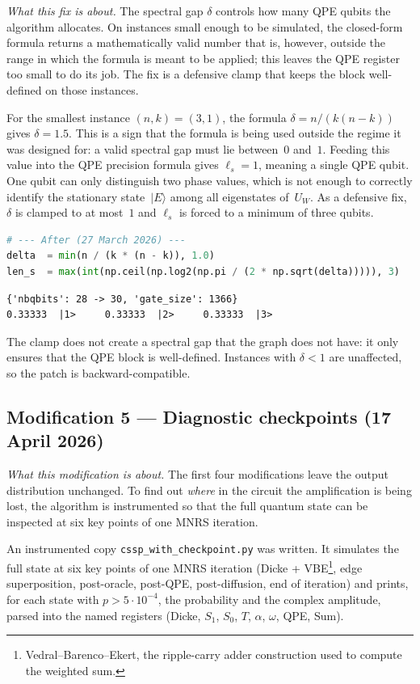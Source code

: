 \documentclass[11pt,a4paper]{article}
\begin{document}
\emph{What this fix is about.} The spectral gap $\delta$ controls
how many QPE qubits the algorithm allocates. On instances small
enough to be simulated, the closed-form formula returns a
mathematically valid number that is, however, outside the range
in which the formula is meant to be applied; this leaves the QPE
register too small to do its job. The fix is a defensive clamp
that keeps the block well-defined on those instances.

For the smallest instance $(n,k)=(3,1)$, the formula $\delta = n/(k(n-k))$ gives $\delta = 1.5$. This is a sign that the formula is being used outside the regime it was designed for: a valid spectral gap must lie between~$0$ and~$1$. Feeding this value into the QPE precision formula gives $\ell_s = 1$, meaning a single QPE qubit. One qubit can only distinguish two phase values, which is not enough to correctly identify the stationary state~$|E\rangle$ among all eigenstates of~$U_W$. As a defensive fix, $\delta$ is clamped to at most~$1$ and $\ell_s$ is forced to a minimum of three qubits.

\begin{lstlisting}[language=Python]
# --- After (27 March 2026) ---
delta  = min(n / (k * (n - k)), 1.0)
len_s  = max(int(np.ceil(np.log2(np.pi / (2 * np.sqrt(delta))))), 3)
\end{lstlisting}

\begin{lstlisting}[style=plain]
{'nbqbits': 28 -> 30, 'gate_size': 1366}
0.33333  |1>     0.33333  |2>     0.33333  |3>
\end{lstlisting}

The clamp does not create a spectral gap that the graph does not
have: it only ensures that the QPE block is well-defined.
Instances with $\delta < 1$ are unaffected, so the patch is
backward-compatible.

\subsection*{Modification 5 --- Diagnostic checkpoints
(17 April 2026)}

\emph{What this modification is about.} The first four modifications
leave the output distribution unchanged. To find out \emph{where}
in the circuit the amplification is being lost, the algorithm is
instrumented so that the full quantum state can be inspected at
six key points of one MNRS iteration.

An instrumented copy \texttt{cssp\_with\_checkpoint.py} was written.
It simulates the full state at six key points of one MNRS
iteration (Dicke + VBE\footnote{Vedral--Barenco--Ekert, the ripple-carry adder construction used to compute the weighted sum.}, edge superposition, post-oracle, post-QPE,
post-diffusion, end of iteration) and prints, for each state with
$p > 5 \cdot 10^{-4}$, the probability and the complex amplitude,
parsed into the named registers (Dicke, $S_1$, $S_0$, $T$,
$\alpha$, $\omega$, QPE, Sum).
\end{document}
